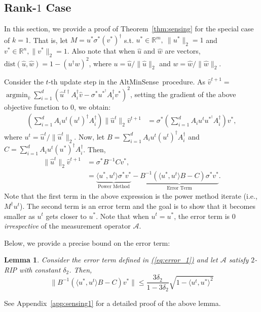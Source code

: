 \documentclass[11pt]{article}
\renewcommand{\eqref}[1]{\hyperref[#1]{(\ref*{#1})}}
\theoremstyle{plain}
\newtheorem{lemma}[theorem]{Lemma}
\theoremstyle{definition}
\newcommand{\dist}{\mathrm{dist}}
\DeclareMathOperator*{\argmin}{argmin}
\newcommand{\aff}{{\mathcal A}}
\newcommand{\so}{\sigma^*}
\newcommand{\vto}{v^{t+1}}
\newcommand{\ut}{u^t}
\newcommand{\uo}{u^* }
\newcommand{\vo}{v^* }
\newcommand{\wvto}{\widehat{v}^{t+1}}
\newcommand{\ip}[2]{\langle #1, #2 \rangle}
\newcommand{\as}{AltMinSense\ }
\begin{document}
\subsection{Rank-$1$ Case}\label{sec:sensing_1}
In this section, we provide a proof of Theorem~\ref{thm:sensing} for the special case of $k=1$. That is, let $M=u^*\sigma^*(v^*)^\dag $ s.t. $u^*\in\mathbb{R}^{m},\ \|u^*\|_2=1$ and $v^*\in\mathbb{R}^{n}, \|v^*\|_2=1$. Also note that when $\widehat{u}$ and $\widehat{w}$ are vectors, $\dist(\widehat{u}, \widehat{w})=1-(u^\dag w)^2$, where $u=\widehat{u}/\|\widehat{u}\|_2$ and $w=\widehat{w}/\|\widehat{w}\|_2$. 

Consider the $t$-th update step in the \as procedure. As $\widehat{v}^{t+1}=$\\
$\argmin_{\widehat{v}}\sum_{i=1}^d\left(\widehat{u}^{t\dag} A_i^\dag \widehat{v}-\so u^{*^\dag} A_i^\dag v^*\right)^2$,
setting the gradient of the above objective function to $0$, we obtain:
\begin{align*}
  \left(\sum_{i=1}^d A_iu^t(u^t)^\dag A_i^\dag \right)\|\widehat{u}^t\|_2\wvto&=\sigma^*\left(\sum_{i=1}^d A_iu^tu^{*^\dag} A_i^\dag \right)\vo,%
\end{align*}
where $u^t=\widehat{u}^t/\|\widehat{u}^t\|_2$. 
Now, let $B=\sum_{i=1}^d A_iu^t(u^t)^\dag A_i^\dag$ and $C=\sum_{i=1}^d A_iu^t(u^*)^\dag A_i^\dag$. Then, 
\begin{align}
  \|\widehat{u}^t\|_2\wvto&=\sigma^*B^{-1}C\vo,\nonumber\\
&=\underbrace{\ip{\uo}{\ut}\sigma^*\vo}_{\text{Power Method}}-\underbrace{B^{-1}\left(\ip{\uo}{\ut}B-C\right)\sigma^*\vo}_{\text{Error Term}}. \label{eq:error_1}
\end{align}
Note that the first term in the above expression is the power method iterate (i.e., $M^{\dag} u^t$). The second term is an error term and the goal is to show that it becomes smaller as $\ut$ gets closer to $\uo$. Note that when $\ut=\uo$, the error term is $0$ {\em irrespective} of the measurement operator $\aff$.

Below, we provide a precise bound on the error term:
\begin{lemma}
\label{lem:error_1}
Consider the error term defined in \eqref{eq:error_1} and let $\aff$ satisfy $2$-RIP with constant $\delta_{2}$. Then, 
$$\|B^{-1}\left(\ip{\uo}{\ut}B-C\right)\vo\|\leq \frac{3\delta_{2}}{1-3\delta_{2}}\sqrt{1-\ip{\ut}{\uo}^2}$$
\end{lemma}
See Appendix~\ref{app:sensing1} for a detailed proof of the above lemma. 
\end{document}
